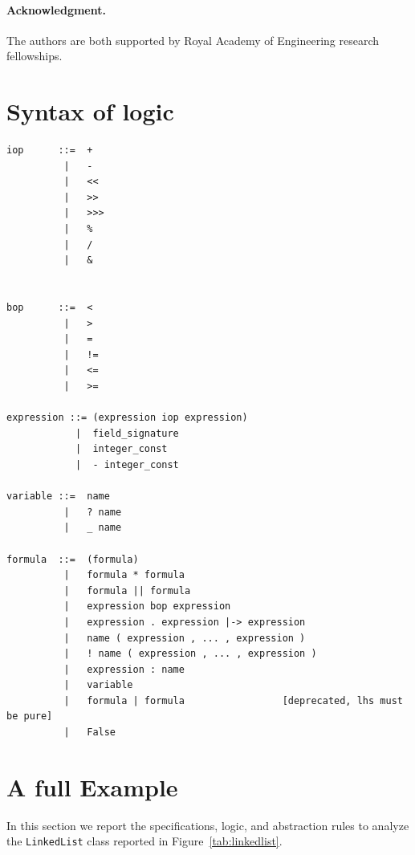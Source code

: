\documentclass[11pt]{article}
\begin{document}
\paragraph{Acknowledgment.}
The authors are both supported by Royal Academy of Engineering research fellowships.




\appendix 
\section{Syntax of logic}

\begin{verbatim}
iop      ::=  +
          |   -
          |   <<
          |   >>
          |   >>>
          |   %
          |   /
          |   &


bop      ::=  <  
          |   >
          |   =
          |   !=
          |   <=
          |   >=

expression ::= (expression iop expression)
            |  field_signature
            |  integer_const
            |  - integer_const
              
variable ::=  name
          |   ? name
          |   _ name

formula  ::=  (formula)
          |   formula * formula
          |   formula || formula
          |   expression bop expression
          |   expression . expression |-> expression
          |   name ( expression , ... , expression ) 
          |   ! name ( expression , ... , expression ) 
          |   expression : name
          |   variable
          |   formula | formula                 [deprecated, lhs must be pure]
          |   False
\end{verbatim}

\section{A full Example}
In this section we report the specifications, logic, and abstraction rules to analyze the {\tt LinkedList} class
 reported in Figure~\ref{tab:linkedlist}.
\end{document}
